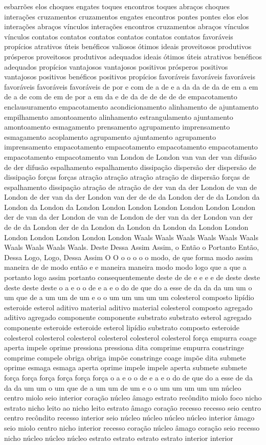 esbarrões elos choques engates toques encontros toques abraços choques interações cruzamentos cruzamentos engates encontros pontes pontes elos elos interações abraços vínculos interações encontros cruzamentos abraços vínculos vínculos contatos contatos contatos contatos contatos contatos favoráveis propícios atrativos úteis benéficos valiosos ótimos ideais proveitosos produtivos prósperos proveitosos produtivos adequados ideais ótimos úteis atrativos benéficos adequados propícios vantajosos vantajosos positivos prósperos positivos vantajosos positivos benéficos positivos propícios favoráveis favoráveis favoráveis favoráveis favoráveis favoráveis de por e com de a de e a da da de da de em a em de a de com de em de por a em da e de da de de de de de empacotamento enclausuramento empacotamento acondicionamento alinhamento de ajuntamento empilhamento amontoamento alinhamento estrangulamento ajuntamento amontoamento esmagamento prensamento agrupamento imprensamento esmagamento acoplamento agrupamento ajuntamento agrupamento imprensamento empacotamento empacotamento empacotamento empacotamento empacotamento empacotamento van London de London van van der van difusão de der difusão espalhamento espalhamento dissipação dispersão der dispersão de dissipação forças forças atração atração atração atração de dispersão forças de espalhamento dissipação atração de atração de der van da der London de van de London de der van da der London van der de de da London der de da London da London da London da London London London London London London London der de van da der London de van de London de der van da der London van der de de da London der de da London da London da London da London London London London London London London Waals Waals Waals Waals Waals Waals Waals Waals Waals Waals. Deste Dessa Assim Assim, o Então o Portanto Então, Dessa Logo, Logo, Dessa Assim O O o o o o o modo, de que forma modo assim maneira de de modo então e e maneira maneira modo modo logo que a que a portanto logo assim portanto consequentemente deste de de e e e e de deste deste deste deste deste o a e o o de e a e o do de que do a esse de da da da um um o um que de a um um de um e o o um um um um um colesterol composto lipídio esteroide esterol aditivo material aditivo material colesterol composto agregado aditivo agregado componente componente substrato substrato esterol agregado componente esteroide esteroide esterol lipídio substrato composto esteroide colesterol colesterol colesterol colesterol colesterol colesterol força empurra coage aperta impele oprime pressiona pressiona dita comprime empurra constringe comprime compele obriga obriga impõe constringe coage impõe dita submete oprime esmaga esmaga aperta oprime impele impele aperta submete submete força força força força força força o a e o o de e a e o do de que do a esse de da da da um um o um que de a um um de um e o o um um um um um núcleo centro miolo seio interior coração núcleo âmago estrato recôndito miolo foco nicho estrato nicho leito ao nicho leito estrato âmago coração recesso recesso seio centro centro recôndito recesso interior seio núcleo núcleo núcleo núcleo interior âmago seio miolo centro nicho interior recesso coração núcleo âmago coração seio recesso nicho núcleo núcleo núcleo estrato estrato estrato estrato interior interior 